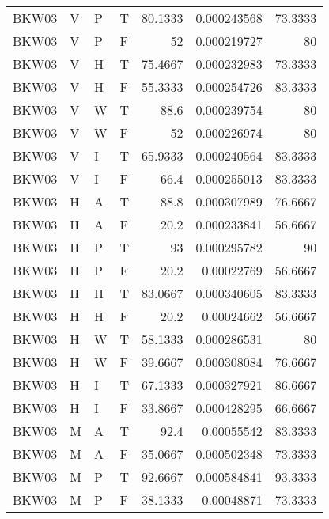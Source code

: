 \begin{longtable}{llllrrr}
    BKW03    & V     & P     & T          & 80.1333    & 0.000243568 & 73.3333  \\
    BKW03    & V     & P     & F          & 52         & 0.000219727 & 80       \\
    BKW03    & V     & H     & T          & 75.4667    & 0.000232983 & 73.3333  \\
    BKW03    & V     & H     & F          & 55.3333    & 0.000254726 & 83.3333  \\
    BKW03    & V     & W     & T          & 88.6       & 0.000239754 & 80       \\
    BKW03    & V     & W     & F          & 52         & 0.000226974 & 80       \\
    BKW03    & V     & I     & T          & 65.9333    & 0.000240564 & 83.3333  \\
    BKW03    & V     & I     & F          & 66.4       & 0.000255013 & 83.3333  \\
    BKW03    & H     & A     & T          & 88.8       & 0.000307989 & 76.6667  \\
    BKW03    & H     & A     & F          & 20.2       & 0.000233841 & 56.6667  \\
    BKW03    & H     & P     & T          & 93         & 0.000295782 & 90       \\
    BKW03    & H     & P     & F          & 20.2       & 0.00022769  & 56.6667  \\
    BKW03    & H     & H     & T          & 83.0667    & 0.000340605 & 83.3333  \\
    BKW03    & H     & H     & F          & 20.2       & 0.00024662  & 56.6667  \\
    BKW03    & H     & W     & T          & 58.1333    & 0.000286531 & 80       \\
    BKW03    & H     & W     & F          & 39.6667    & 0.000308084 & 76.6667  \\
    BKW03    & H     & I     & T          & 67.1333    & 0.000327921 & 86.6667  \\
    BKW03    & H     & I     & F          & 33.8667    & 0.000428295 & 66.6667  \\
    BKW03    & M     & A     & T          & 92.4       & 0.00055542  & 83.3333  \\
    BKW03    & M     & A     & F          & 35.0667    & 0.000502348 & 73.3333  \\
    BKW03    & M     & P     & T          & 92.6667    & 0.000584841 & 93.3333  \\
    BKW03    & M     & P     & F          & 38.1333    & 0.00048871  & 73.3333  \\

\end{longtable}
